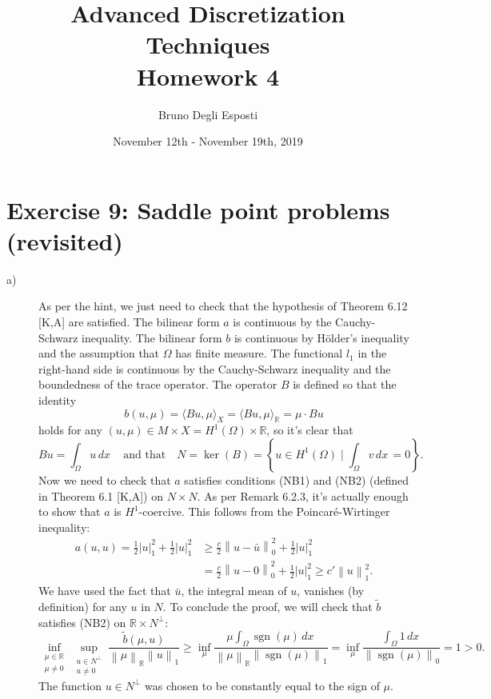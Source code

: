 \documentclass[a4paper]{article}
\title{\huge{Advanced Discretization Techniques \\ Homework 4}}
\author{\Large{Bruno Degli Esposti}}
\date{November 12th - November 19th, 2019}
\DeclareMathOperator{\sgn}{sgn}
\newcommand{\seminorm}[1]{\left\lvert#1\right\rvert}
\newcommand{\dx}{\, dx \,}
\newcommand{\norm}[1]{\left\lVert#1\right\rVert}
\newcommand{\R}{\mathbb{R}}
\begin{document}
\maketitle

\section*{Exercise 9: Saddle point problems (revisited)}
\begin{description}
\item[a)] As per the hint, we just need to check that the hypothesis of Theorem 6.12 
	{\small[K,A]} are satisfied.
	The bilinear form $a$ is continuous by the Cauchy-Schwarz
	inequality. The bilinear form $b$ is continuous by Hölder's inequality and
	the assumption that $\Omega$ has finite measure.
	The functional $l_1$ in the right-hand side is continuous by the Cauchy-Schwarz
	inequality and the boundedness of the trace operator.
	The operator $B$ is defined so that the identity
	\[
	b(u,\mu) = \langle Bu, \mu \rangle_X = \langle Bu, \mu \rangle_\R = \mu \cdot Bu
	\]
	holds for any $(u,\mu) \in M \times X = H^1(\Omega) \times \R$,
	so it's clear that
	\[
	Bu = \int_\Omega u \dx \quad \text{and that} \quad
	N = \ker(B) = \left\{ u \in H^1(\Omega) \mid \int_\Omega v \dx = 0 \right\}.
	\]
	Now we need to check that $a$ satisfies conditions (NB1) and (NB2)
	(defined in Theorem 6.1 {\small[K,A]}) on $N \times N$.
	As per Remark 6.2.3, it's actually enough to show that $a$
	is $H^1$-coercive. This follows from the Poincaré-Wirtinger inequality:
	\begin{align*}
	a(u,u)
	= \frac{1}{2} \seminorm{u}_1^2 + \frac{1}{2} \seminorm{u}_1^2
&	\geq \frac{c}{2} \norm{u - \bar{u}}_0^2 + \frac{1}{2} \seminorm{u}_1^2 \\
&	= \frac{c}{2} \norm{u - 0}_0^2 + \frac{1}{2} \seminorm{u}_1^2
	\geq c' \norm{u}_1^2.
	\end{align*}
	We have used the fact that $\bar{u}$, the integral mean of $u$, vanishes
	(by definition) for any $u$ in $N$. To conclude the proof,
	we will check that $\tilde{b}$ satisfies (NB2) on $\R \times N^\perp$:
	\[
	\inf_{\substack{\mu \in \R \\ \mu \neq 0}}
		\sup_{\substack{u \in N^\perp \\ u \neq 0}}
		\frac{\tilde{b}(\mu,u)}{\norm{\mu}_\R \norm{u}_1}
	\geq \inf_{\mu} \frac{\mu \int_\Omega \sgn(\mu) \dx}{\norm{\mu}_\R \norm{\sgn(\mu)}_1}
	= \inf_{\mu} \frac{\int_\Omega 1 \dx}{\norm{\sgn(\mu)}_0}
	= 1 > 0.
	\]
	The function $u \in N^\perp$ was chosen to be constantly equal to the sign of $\mu$.

\end{description}
\end{document}
